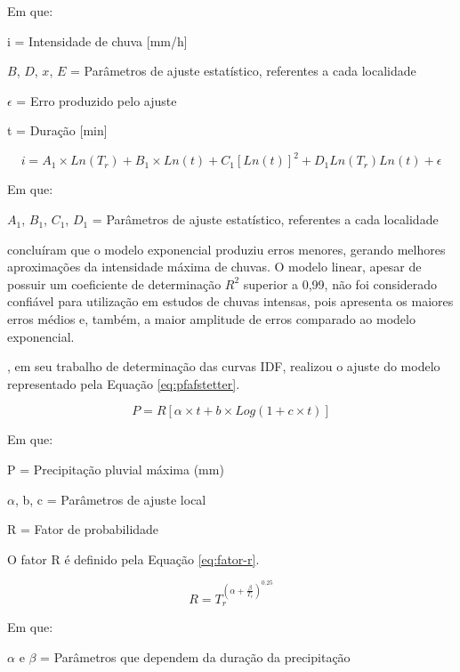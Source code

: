 Em que:

i = Intensidade de chuva [mm/h]

$B$, $D$, $x$, $E$ = Parâmetros de ajuste estatístico, referentes a cada localidade

$\epsilon$ = Erro produzido pelo ajuste

t = Duração [min]


\begin{equation}
\label{eq:exponencial}
    i = A_1 \times Ln(T_r) + B_1 \times Ln(t) + C_1[Ln(t)]^2 + D_1Ln(T_r)Ln(t) + \epsilon
\end{equation}

Em que:

$A_1$, $B_1$, $C_1$, $D_1$ = Parâmetros de ajuste estatístico, referentes a cada localidade \\

\par {} concluíram que o modelo exponencial produziu erros menores, gerando melhores aproximações da intensidade máxima de chuvas. O modelo linear, apesar de possuir um coeficiente de determinação $R^2$ superior a 0,99, não foi considerado confiável para utilização em estudos de chuvas intensas, pois apresenta os maiores erros médios e, também, a maior amplitude de erros comparado ao modelo exponencial.

, em seu trabalho de determinação das curvas IDF, realizou o ajuste do modelo representado pela Equação \ref{eq:pfafstetter}.

\begin{equation}
\label{eq:pfafstetter}
    P=R[\alpha \times t + b \times Log(1 + c \times t)]
\end{equation}

Em que:

P = Precipitação pluvial máxima (mm)

$\alpha$, b, c = Parâmetros de ajuste local

R = Fator de probabilidade \\

\par O fator R é definido pela Equação \ref{eq:fator-r}.

\begin{equation}
\label{eq:fator-r}
    R = T_r^{(\alpha + \frac{\beta}{T_r})^{0.25}}
\end{equation}

Em que:

$\alpha$ e $\beta$ = Parâmetros que dependem da duração da precipitação \\

